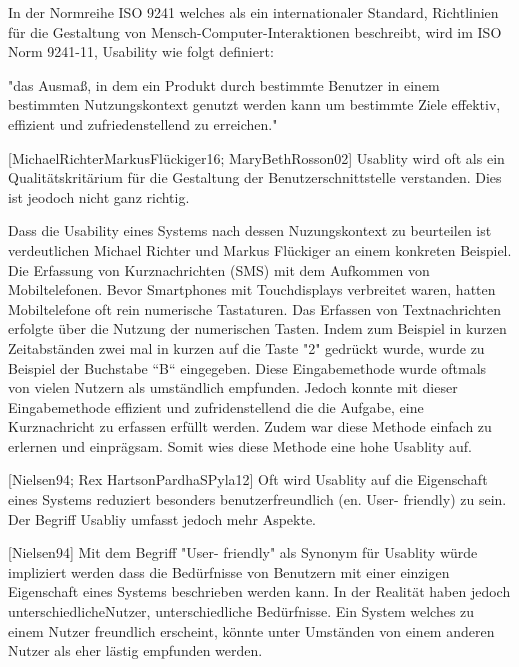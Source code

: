 In der Normreihe ISO 9241 welches als ein internationaler Standard,  Richtlinien für die Gestaltung von Mensch-Computer-Interaktionen beschreibt, wird im ISO Norm 9241-11,  Usability wie folgt definiert:

"das Ausmaß, in dem ein Produkt durch bestimmte Benutzer in einem bestimmten Nutzungskontext genutzt werden kann um bestimmte Ziele effektiv, effizient und zufriedenstellend zu erreichen."

[MichaelRichterMarkusFlückiger16; MaryBethRosson02] Usablity wird  oft als ein Qualitätskritärium für die Gestaltung der Benutzerschnittstelle verstanden. Dies ist jeodoch nicht ganz richtig.

Dass die Usability eines Systems nach dessen Nuzungskontext zu beurteilen ist verdeutlichen Michael Richter und Markus Flückiger an einem konkreten Beispiel.
Die Erfassung von Kurznachrichten (SMS) mit dem Aufkommen von Mobiltelefonen.  Bevor Smartphones mit Touchdisplays verbreitet waren, hatten Mobiltelefone oft rein 
numerische Tastaturen. Das Erfassen von Textnachrichten erfolgte über die Nutzung der numerischen Tasten. Indem zum Beispiel in kurzen Zeitabständen zwei mal in kurzen  
auf die Taste "2" gedrückt wurde, wurde zu Beispiel der Buchstabe ``B`` eingegeben. Diese Eingabemethode wurde oftmals von vielen Nutzern als umständlich empfunden. 
Jedoch konnte mit dieser Eingabemethode effizient und zufridenstellend die die Aufgabe, eine Kurznachricht zu erfassen erfüllt werden. Zudem war diese Methode einfach 
zu erlernen und einprägsam. Somit wies diese Methode eine hohe Usablity auf. 

[Nielsen94; Rex HartsonPardhaSPyla12] Oft wird Usablity auf die Eigenschaft eines Systems reduziert besonders benutzerfreundlich (en. User- friendly) zu sein. Der Begriff Usabliy umfasst jedoch mehr Aspekte. 

[Nielsen94] Mit dem Begriff "User- friendly" als Synonym für Usablity würde impliziert werden dass die Bedürfnisse von Benutzern mit einer einzigen Eigenschaft 
eines Systems beschrieben werden kann. In der Realität haben jedoch unterschiedlicheNutzer, unterschiedliche Bedürfnisse. Ein System welches zu einem Nutzer freundlich erscheint, könnte unter 
Umständen von einem anderen Nutzer als eher lästig empfunden werden.


